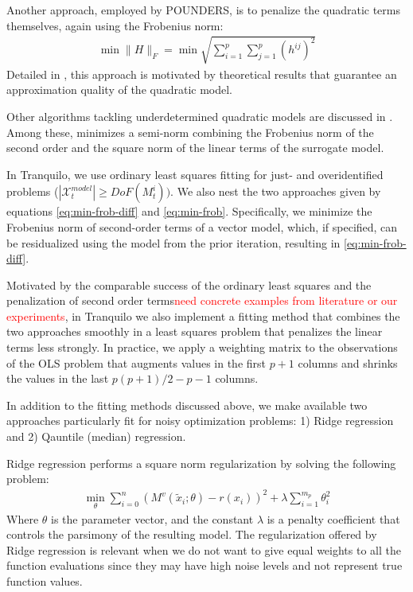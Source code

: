 Another approach, employed by POUNDERS, is to penalize the quadratic terms themselves, again using the Frobenius norm:
\begin{align}
\min\lVert H\rVert_F =\min\sqrt{\sum\limits_{i=1}^p\sum\limits_{j=1}^{p}(h^{ij})^2}
\label{eq:min-frob}
\end{align}
Detailed in \cite{Wild2008}, this approach is motivated by theoretical results that guarantee an approximation quality of the quadratic model.

Other algorithms tackling underdetermined quadratic models are discussed in \cite{Larson2019}. Among these, \cite{Powell2012} minimizes a semi-norm combining the Frobenius norm of the second order and the square norm of the linear terms of the surrogate model.

In Tranquilo, we use ordinary least squares fitting for just- and overidentified problems ($|\mathcal{X}_t^{model}|\geq DoF(M_t^{i}))$. We also nest the two approaches given by equations \ref{eq:min-frob-diff} and \ref{eq:min-frob}. Specifically, we minimize the Frobenius norm of second-order terms of a vector model, which, if specified, can be residualized using the model from the prior iteration, resulting in \ref{eq:min-frob-diff}.

Motivated by the comparable success of the ordinary least squares and the penalization of second order terms\textcolor{red}{need concrete examples from literature or our experiments}, in Tranquilo we also implement a fitting method that combines the two approaches smoothly in a least squares problem that penalizes the linear terms less strongly. In practice, we apply a weighting matrix to the observations of the OLS problem that augments values in the first $p+1$ columns and shrinks the values in the last $p(p+1)/2-p-1$ columns.

In addition to the fitting methods discussed above, we make available two approaches particularly fit for noisy optimization problems: 1) Ridge regression and 2) Qauntile (median) regression.

Ridge regression performs a square norm regularization by solving the following problem:
\begin{align}
    \min\limits_{\theta}\sum\limits_{i=0}^{n}(M^v(\tilde{x}_i;\theta)-r(x_i))^2+\lambda\sum\limits_{i=1}^{m_p}\theta_i^2
    \label{eq:fit-ridge}
\end{align}
Where $\theta$ is the parameter vector, and the constant $\lambda$ is a penalty coefficient that controls the parsimony of the resulting model. The regularization offered by Ridge regression is relevant when we do not want to give equal weights to all the function evaluations since they may have high noise levels and not represent true function values.

